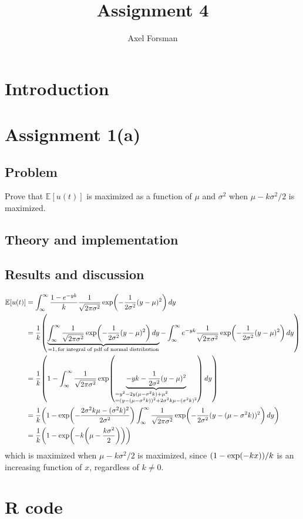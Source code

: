 \documentclass[11pt, a4paper]{article}
\title{Assignment 4}
\author{Axel Forsman}
\let\originalleft\left
\let\originalright\right
\renewcommand{\left}{\mathopen{}\mathclose\bgroup\originalleft}
\renewcommand{\right}{\aftergroup\egroup\originalright}
\begin{document}
\maketitle

\section{Introduction}

\section{Assignment 1(a)}
\subsection{Problem}
Prove that $\mathbb E[u(t)]$ is maximized as a function of
$\mu$ and $\sigma^2$ when $\mu - k\sigma^2/2$ is maximized.
\subsection{Theory and implementation}
\subsection{Results and discussion}
\begin{align*}
	\mathbb E[u(t)] &= \int_\infty^\infty \frac{1 - e^{-yk}}k \frac1{\sqrt{2\pi\sigma^2}}
		\exp\left(-\frac1{2\sigma^2} (y - \mu)^2\right) \, dy \\
		&= \frac1k \left(\underbrace{\int_\infty^\infty \frac1{\sqrt{2\pi\sigma^2}} \exp\left(-\frac1{2\sigma^2} (y - \mu)^2\right) \, dy}_{=1, \, \text{for integral of pdf of normal distribution}}
		- \int_\infty^\infty e^{-yk} \frac1{\sqrt{2\pi\sigma^2}} \exp\left(-\frac1{2\sigma^2} (y - \mu)^2\right) \, dy\right) \\
		&= \frac1k \left(1 - \int_\infty^\infty \frac1{\sqrt{2\pi\sigma^2}}
			\exp\left(\underbrace{-yk - \frac1{2\sigma^2} (y - \mu)^2}_{\begin{subarray}{1}
				= y^2 - 2y(\mu - \sigma^2k) + \mu^2 \\
				= (y - (\mu - \sigma^2k))^2 + 2\sigma^2k\mu - (\sigma^2k)^2
			\end{subarray}}\right) \, dy\right) \\
		&= \frac1k \left(1 - \exp\left(-\frac{2\sigma^2k\mu - (\sigma^2k)^2}{2\sigma^2}\right)
			\int_\infty^\infty \frac1{\sqrt{2\pi\sigma^2}} \exp\left(-\frac1{2\sigma^2} (y - (\mu - \sigma^2k))^2\right) \, dy\right) \\
		&= \frac1k \left(1 - \exp\left(-k \left(\mu - \frac{k\sigma^2}2\right)\right)\right)
\end{align*}
which is maximized when $\mu - k\sigma^2/2$ is maximized, since
$\left(1 - \exp\left(-k x\right)\right) / k$
is an increasing function of $x$, regardless of $k \ne 0$.

\clearpage
\appendix %

\section{R code}
% 
\end{document}

